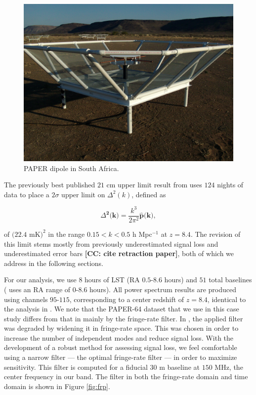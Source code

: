 \documentclass[preprint2,numberedappendix,tighten]{aastex6}  %
\newcommand{\cc}[1]{{\color{purple} \textbf{[CC: #1]}}}
\begin{document}
\begin{figure}
	\centering
	\includegraphics[trim={0.3cm 0.3cm 0.3cm 0.3cm},width=\columnwidth]{plots/paper_dipole.png}
	\caption{PAPER dipole in South Africa.}
	\label{fig:paper}
\end{figure}

The previously best published $21$ cm upper limit result from \citet{ali_et_al2015} uses $124$ nights of data to place a $2\sigma$ upper limit on $\Delta^{2}(k)$, defined as

\begin{equation}
\Delta^{\textbf{2}}\textbf{(k)} = \frac{k^{3}}{2\pi^{2}}\hat{\textbf{p}}\textbf{(k)},
\end{equation}

\noindent of $(22.4$ mK$)^{2}$ in the range $0.15 < k < 0.5$ h Mpc$^{-1}$ at $z = 8.4$. The revision of this limit stems mostly from previously underestimated signal loss and underestimated error bars \cc{cite retraction paper}, both of which we address in the following sections. 

For our analysis, we use $8$ hours of LST (RA $0.5$-$8.6$ hours) and $51$ total baselines (\citet{ali_et_al2015} uses an RA range of $0$-$8.6$ hours). All power spectrum results are produced using channels $95$-$115$, corresponding to a center redshift of $z=8.4$, identical to the analysis in \citet{ali_et_al2015}. We note that the PAPER-64 dataset that we use in this case study differs from that in \citet{ali_et_al2015} mainly by the fringe-rate filter. In \citet{ali_et_al2015}, the applied filter was degraded by widening it in fringe-rate space. This was chosen in order to increase the number of independent modes and reduce signal loss. With the development of a robust method for assessing signal loss, we feel comfortable using a narrow filter --- the optimal fringe-rate filter --- in order to maximize sensitivity. This filter is computed for a fiducial $30$ m baseline at $150$ MHz, the center frequency in our band. The filter in both the fringe-rate domain and time domain is shown in Figure \ref{fig:frp}.
\end{document}
